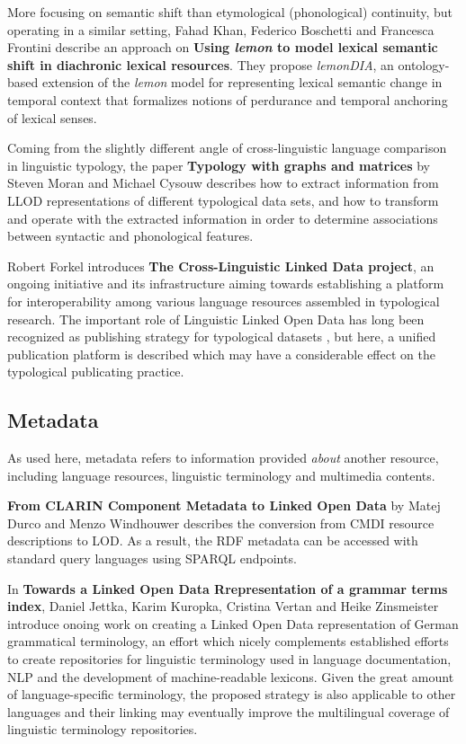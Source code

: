 	More focusing on semantic shift than etymological (phonological) continuity, but operating in a similar setting, 
	Fahad Khan, Federico Boschetti and Francesca Frontini describe an approach on \textbf{Using \emph{lemon} to model lexical semantic shift in diachronic lexical resources}. 
	They propose \emph{lemonDIA}, an ontology-based extension of the \emph{lemon} model for representing lexical semantic change in temporal context that formalizes notions of perdurance and temporal anchoring of lexical senses. 

	Coming from the slightly different angle of cross-linguistic language comparison in linguistic typology, the paper 
	\textbf{Typology with graphs and matrices} by Steven Moran and Michael Cysouw describes how to extract information from LLOD representations of different typological data sets, and how to transform and operate with the extracted information in order to determine associations between syntactic and phonological features.

	Robert Forkel introduces \textbf{The Cross-Linguistic Linked Data project},
	an ongoing initiative and its infrastructure aiming towards establishing a platform 
	for interoperability among various language resources assembled in typological research. 
	The important role of Linguistic Linked Open Data has long been recognized as publishing strategy for 
	typological datasets \citep{ldl2012}, but here, a unified 
	publication platform is described which may have a considerable effect on the typological publicating practice.
	
\subsection{Metadata}

	As used here, metadata refers to information provided \emph{about} another resource, including language resources, linguistic terminology and multimedia contents.
	
	\textbf{From CLARIN Component Metadata to Linked Open Data} by 
	Matej Durco and Menzo Windhouwer describes the conversion from CMDI resource descriptions to LOD. 
	As a result, the RDF metadata can be accessed with standard query languages using SPARQL endpoints. 

	In \textbf{Towards a Linked Open Data Rrepresentation of a grammar terms index},
	Daniel Jettka, Karim Kuropka, Cristina Vertan and Heike Zinsmeister introduce onoing work on creating a Linked Open Data 
	representation of German grammatical terminology, an effort which nicely complements established efforts to create repositories for linguistic terminology used in language documentation, NLP and the development of machine-readable lexicons. Given the great amount of language-specific terminology, the proposed strategy is also applicable to other languages and their linking may eventually improve the multilingual coverage of linguistic terminology repositories.

